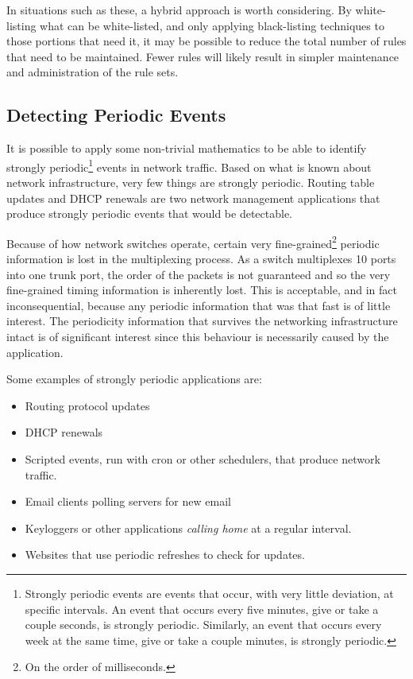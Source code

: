 \documentclass{article}
\theoremstyle{remark}
\theoremstyle{definition}
\theoremstyle{definition}
\theoremstyle{definition}
\begin{document}
In situations such as these, a hybrid approach is worth considering. By white-listing what can be white-listed, and only applying black-listing techniques to those portions that need it, it may be possible to reduce the total number of rules that need to be maintained. Fewer rules will likely result in simpler maintenance and administration of the rule sets.

\subsection{Detecting Periodic Events}
It is possible to apply some non-trivial mathematics to be able to identify strongly periodic\footnote{Strongly periodic events are events that occur, with very little deviation, at specific intervals. An event that occurs every five minutes, give or take a couple seconds, is strongly periodic. Similarly, an event that occurs every week at the same time, give or take a couple minutes, is strongly periodic.} events in network traffic. Based on what is known about network infrastructure, very few things are strongly periodic. Routing table updates and DHCP renewals are two network management applications that produce strongly periodic events that would be detectable.

Because of how network switches operate, certain very fine-grained\footnote{On the order of milliseconds.} periodic information is lost in the multiplexing process. As a switch multiplexes 10 ports into one trunk port, the order of the packets is not guaranteed and so the very fine-grained timing information is inherently lost. This is acceptable, and in fact inconsequential, because any periodic information that was that fast is of little interest. The periodicity information that survives the networking infrastructure intact is of significant interest since this behaviour is necessarily caused by the application.

Some examples of strongly periodic applications are:

\begin{itemize}
\item Routing protocol updates
\item DHCP renewals
\item Scripted events, run with cron or other schedulers, that produce network traffic.
\item Email clients polling servers for new email
\item Keyloggers or other applications \emph{calling home} at a regular interval.
\item Websites that use periodic refreshes to check for updates.
\end{itemize}
\end{document}
